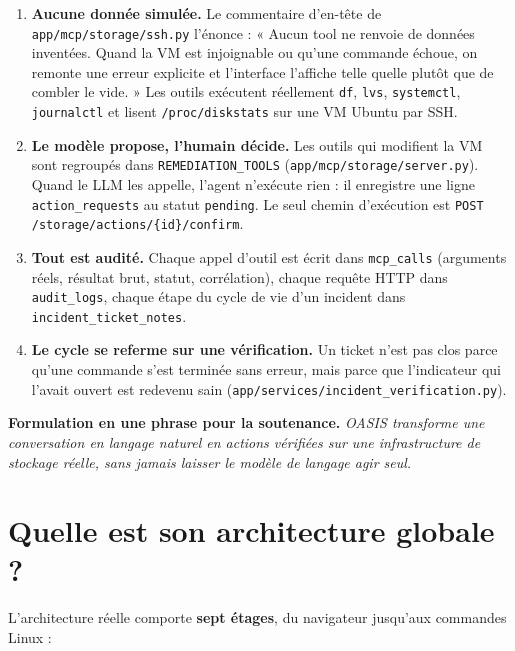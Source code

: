 \documentclass[11pt,a4paper]{report}
\newcommand{\file}[1]{\texttt{\small #1}}
\newcommand{\fn}[1]{\texttt{\small\textcolor{oasisviolet}{#1}}}
\newcommand{\tbl}[1]{\texttt{\small\textcolor{oasisamber}{#1}}}
\newcommand{\route}[1]{\texttt{\small\textcolor{oasisgreen}{#1}}}
\begin{document}
\begin{enumerate}
  \item \textbf{Aucune donnée simulée.} Le commentaire d'en-tête de
  \file{app/mcp/storage/ssh.py} l'énonce : « Aucun tool ne renvoie de données
  inventées. Quand la VM est injoignable ou qu'une commande échoue, on remonte
  une erreur explicite et l'interface l'affiche telle quelle plutôt que de
  combler le vide. » Les outils exécutent réellement \texttt{df}, \texttt{lvs},
  \texttt{systemctl}, \texttt{journalctl} et lisent \texttt{/proc/diskstats}
  sur une VM Ubuntu par SSH.

  \item \textbf{Le modèle propose, l'humain décide.} Les outils qui modifient la
  VM sont regroupés dans \fn{REMEDIATION\_TOOLS}
  (\file{app/mcp/storage/server.py}). Quand le LLM les appelle, l'agent
  n'exécute rien : il enregistre une ligne \tbl{action\_requests} au statut
  \texttt{pending}. Le seul chemin d'exécution est
  \route{POST /storage/actions/\{id\}/confirm}.

  \item \textbf{Tout est audité.} Chaque appel d'outil est écrit dans
  \tbl{mcp\_calls} (arguments réels, résultat brut, statut, corrélation), chaque
  requête HTTP dans \tbl{audit\_logs}, chaque étape du cycle de vie d'un
  incident dans \tbl{incident\_ticket\_notes}.

  \item \textbf{Le cycle se referme sur une vérification.} Un ticket n'est pas
  clos parce qu'une commande s'est terminée sans erreur, mais parce que
  l'indicateur qui l'avait ouvert est redevenu sain
  (\file{app/services/incident\_verification.py}).
\end{enumerate}

\begin{infobox}
\textbf{Formulation en une phrase pour la soutenance.} \emph{OASIS transforme
une conversation en langage naturel en actions vérifiées sur une infrastructure
de stockage réelle, sans jamais laisser le modèle de langage agir seul.}
\end{infobox}

\section{Quelle est son architecture globale ?}

L'architecture réelle comporte \textbf{sept étages}, du navigateur jusqu'aux
commandes Linux :
\end{document}
